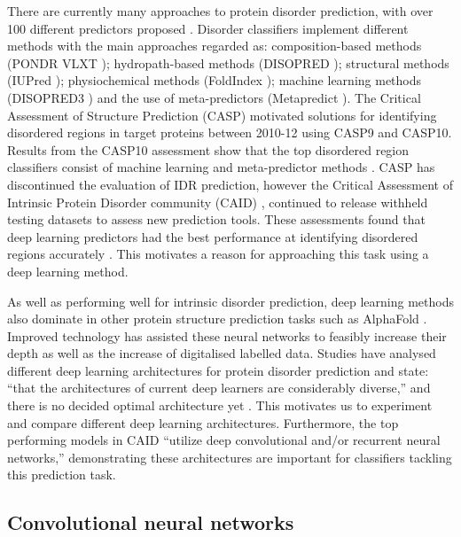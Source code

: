 \documentclass{l4proj}
\begin{document}
There are currently many approaches to protein disorder prediction, with over 100 different predictors proposed \citep{Zhao:22}. Disorder classifiers implement different methods with the main approaches regarded as: composition-based methods (PONDR VLXT \citep{Romero:01}); hydropath-based methods (DISOPRED \citep{Ward:04}); structural methods (IUPred \citep{Dosztanyi:18}); physiochemical methods (FoldIndex \citep{Prilusky:05}); machine learning methods (DISOPRED3 \citep{disopred3_paper}) and the use of meta-predictors (Metapredict \citep{Emenecker:21}). The Critical Assessment of Structure Prediction (CASP) \citep{casp} motivated solutions for identifying disordered regions in target proteins between 2010-12 using CASP9 and CASP10. Results from the CASP10 assessment \citep{CASP10} show that the top disordered region classifiers consist of machine learning and meta-predictor methods \citep{Zhao:22}. CASP has discontinued the evaluation of IDR prediction, however the Critical Assessment of Intrinsic Protein Disorder community (CAID) \citep{Necci:21}, continued to release withheld testing datasets to assess new prediction tools. These assessments found that deep learning predictors had the best performance at identifying disordered regions accurately \citep{Zhao:22}. This motivates a reason for approaching this task using a deep learning method.

As well as performing well for intrinsic disorder prediction, deep learning methods also dominate in other protein structure prediction tasks such as AlphaFold \citep{Jumper:21}. Improved technology has assisted these neural networks to feasibly increase their depth as well as the increase of digitalised labelled data. Studies have analysed different deep learning architectures for protein disorder prediction and state: “that the architectures of current deep learners are considerably diverse,” and there is no decided optimal architecture yet \citep{Zhao:22}. This motivates us to experiment and compare different deep learning architectures. Furthermore, the top performing models in CAID “utilize deep convolutional and/or recurrent neural networks,” \citep{Hu:21} demonstrating these architectures are important for classifiers tackling this prediction task.

\subsection{Convolutional neural networks}
\label{chap:background sec:litrevCNN}
\end{document}

